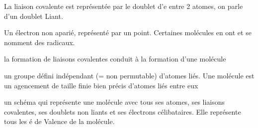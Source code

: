 \documentclass[french]{yLectureNote}
\begin{document}
La liaison covalente est représentée par le doublet d'e entre 2 atomes, on parle d'un doublet Liant.
\begin{theorem}
Un électron non aparié, représenté par un point. Certaines molécules en ont et se nomment des radicaux.

\end{theorem}
la formation de liaisons covalentes conduit à la formation d'une molécule
\begin{theorem}[Molécule]
un groupe défini indépendant (= non permutable) d'atomes liés. Une molécule est un agencement de taille finie bien précis d'atomes liés entre eux
\end{theorem}
%
%
%
%
\begin{theorem}
 un schéma qui représente une molécule avec tous ses atomes, ses liaisons covalentes, ses doublets non liants et ses électrons célibataires. Elle représente tous les é de Valence de la molécule.
\end{theorem}
%
%
\end{document}
